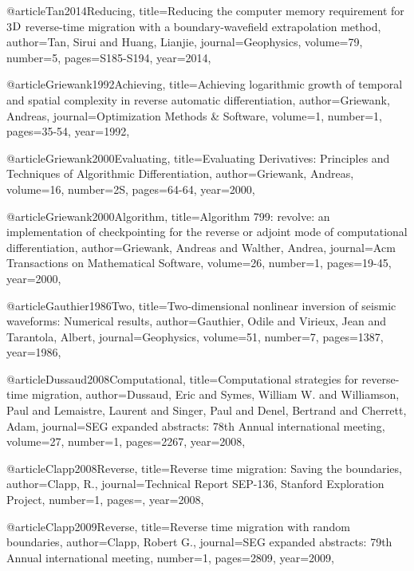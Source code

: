 {@article{Tan2014Reducing,
  title={Reducing the computer memory requirement for 3$\textnormal{D}$ reverse-time migration with a boundary-wavefield extrapolation method},
  author={Tan, Sirui and Huang, Lianjie},
  journal={Geophysics},
  volume={79},
  number={5},
  pages={S185-S194},
  year={2014},
}



@article{Griewank1992Achieving,
  title={Achieving logarithmic growth of temporal and spatial complexity in reverse automatic differentiation},
  author={Griewank, Andreas},
  journal={Optimization Methods \& Software},
  volume={1},
  number={1},
  pages={35-54},
  year={1992},
}

@article{Griewank2000Evaluating,
  title={Evaluating Derivatives: Principles and Techniques of Algorithmic Differentiation},
  author={Griewank, Andreas},
  volume={16},
  number={2S},
  pages={64-64},
  year={2000},
}

@article{Griewank2000Algorithm,
  title={Algorithm 799: revolve: an implementation of checkpointing for the reverse or adjoint mode of computational differentiation},
  author={Griewank, Andreas and Walther, Andrea},
  journal={Acm Transactions on Mathematical Software},
  volume={26},
  number={1},
  pages={19-45},
  year={2000},
}

@article{Gauthier1986Two,
  title={Two‐dimensional nonlinear inversion of seismic waveforms: Numerical results},
  author={Gauthier, Odile and Virieux, Jean and Tarantola, Albert},
  journal={Geophysics},
  volume={51},
  number={7},
  pages={1387},
  year={1986},
}

@article{Dussaud2008Computational,
  title={Computational strategies for reverse-time migration},
  author={Dussaud, Eric and Symes, William W. and Williamson, Paul and Lemaistre, Laurent and Singer, Paul and Denel, Bertrand and Cherrett, Adam},
  journal={SEG expanded abstracts: 78th Annual international meeting},
  volume={27},
  number={1},
  pages={2267},
  year={2008},
}

@article{Clapp2008Reverse,
  title={Reverse time migration: Saving the boundaries},
  author={Clapp, R.},
  journal={Technical Report SEP-136, Stanford Exploration Project},
  number={1},
  pages={},
  year={2008},
}

@article{Clapp2009Reverse,
  title={Reverse time migration with random boundaries},
  author={Clapp, Robert G.},
  journal={SEG expanded abstracts: 79th Annual international meeting},
  number={1},
  pages={2809},
  year={2009},
}

}
